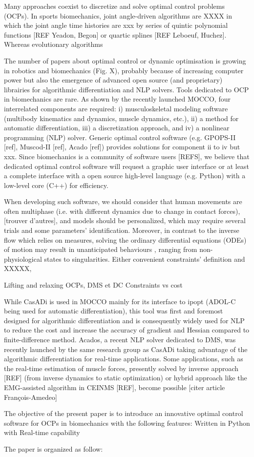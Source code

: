 Many approaches coexist to discretize and solve optimal control problems (OCPs). In sports biomechanics, joint angle-driven algorithms are XXXX in which the joint angle time histories are xxx by series of quintic polynomial functions [REF Yeadon, Begon] or quartic splines [REF Leboeuf, Huchez]. 
Whereas evolutionary algorithms 


The number of papers about optimal control or dynamic optimisation is growing in robotics and biomechanics (Fig. X), probably because of increasing computer power but also the emergence of advanced open source (and proprietary) librairies for algorithmic differentiation and NLP solvers. 
Tools dedicated to OCP in biomechanics are rare. As shown by the recently launched MOCCO, four interrelated components are required: i) musculoskeletal modeling software (multibody kinematics and dynamics, muscle dynamics, etc.), ii) a method for automatic differentiation, iii) a discretization approach, and iv) a nonlinear programming (NLP) solver. Generic optimal control software (e.g. GPOPS-II [ref], Muscod-II [ref], Acado [ref]) provides solutions for component ii to iv but xxx. Since biomechanics is a community of software users [REFS], we believe that dedicated optimal control software will request a graphic user interface or at least a complete interface with a open source high-level language (e.g. Python) with a low-level core (C++) for efficiency. 

When developing such software, we should consider that human movements are often multiphase (i.e. with different dynamics due to change in contact forces), [trouver d’autres], and models should be personalized, which may require several trials and some parameters’ identification. 
Moreover, in contrast to the inverse flow which relies on measures, solving the ordinary differential equations (ODEs) of motion may result in unanticipated behaviours , ranging from non-physiological states to singularities. Either convenient constraints’ definition  and XXXXX, 

Lifting and relaxing OCPs,  
DMS et DC
Constraints vs cost


While CasADi is used in MOCCO mainly for its interface to ipopt (ADOL-C being used for automatic differentiation),  this tool was first and foremost designed for algorithmic differentiation and is consequently widely used for NLP to reduce the cost and increase the accuracy of gradient and Hessian compared to finite-difference method. Acados, a recent NLP solver dedicated to DMS, was recently launched by the same research group as CasADi taking advantage of the algorithmic differentiation for real-time applications. Some applications, such as the real-time estimation of muscle forces, presently solved by inverse approach [REF] (from inverse dynamics to static optimization) or hybrid approach like the EMG-assisted algorithm in CEINMS [REF], become possible [citer article François-Amedeo]


The objective of the present paper is to introduce an innovative optimal control software for OCPs in biomechanics with the following features: 
Written in Python with 
Real-time capability 



The paper is organized as follow: 

